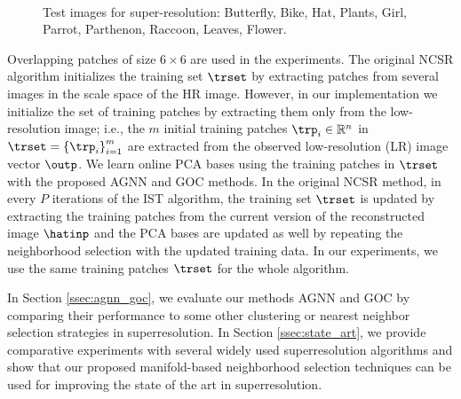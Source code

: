 \documentclass[journal]{IEEEtran}
\begin{document}
\begin{figure}[!t]
\begin{center}
\setcounter{subfigure}{0}   
   
    \\ 
\setcounter{subfigure}{0}   
   
\end{center}
  \caption{Test images for super-resolution: Butterfly, Bike, Hat, Plants, Girl, Parrot, Parthenon, Raccoon, Leaves, Flower.}
\label{fig:images}
\end{figure}

Overlapping patches of size  $6 \times 6$ are used in the experiments. The original NCSR algorithm initializes the training set $\trset$ by extracting patches from several images in the scale space of the HR image. However, in our implementation we initialize the set of training patches by extracting them only from the low-resolution image; i.e., the $m$ initial training patches $\trp_i \in \mathbb{R}^n$ in $\trset= \left\{\trp_i  \right\}_{i=1}^{m}$ are extracted from the observed low-resolution (LR) image vector $\outp$. We learn online PCA bases using the training patches in $\trset$ with the proposed AGNN and GOC methods. In the original NCSR method, in every $P$ iterations of the IST algorithm, the training set $\trset$ is updated by extracting the training patches from the current version of the reconstructed image $\hatinp$ and the PCA bases are updated as well by repeating the neighborhood selection with the updated training data. In our experiments, we use the same training patches $\trset$ for the whole algorithm.




In Section \ref{ssec:agnn_goc}, we evaluate our methods AGNN and GOC by comparing their performance to some other clustering or nearest neighbor selection strategies in superresolution. In Section \ref{ssec:state_art}, we provide comparative experiments with several widely used superresolution algorithms and show that our proposed manifold-based neighborhood selection techniques can be used for improving the state of the art in superresolution.
\end{document}
